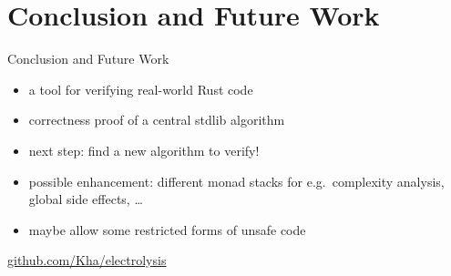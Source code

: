 \documentclass{beamer}
\begin{document}
\section{Conclusion and Future Work}

\begin{frame}{Conclusion and Future Work}
  \begin{itemize}
    \item a tool for verifying real-world Rust code
    \item correctness proof of a central stdlib algorithm

    \hfill

    \item next step: find a new algorithm to verify!
    \item possible enhancement: different monad stacks for e.g.\ complexity analysis, global side effects, \dots
    \item maybe allow some restricted forms of unsafe code
  \end{itemize}

  \hfill

  \begin{center}
    \large\url{github.com/Kha/electrolysis}
  \end{center}
\end{frame}
\end{document}
